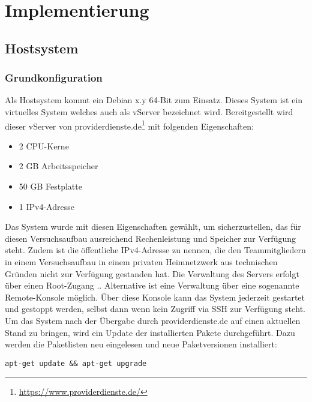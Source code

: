 \chapter{Implementierung}
\label{ch:Implementierung}

\section{Hostsystem}
\label{sec:Hostsystem}

\subsection{Grundkonfiguration}
\label{subsec:Grundkonfiguration}

Als Hostsystem kommt ein Debian x.y 64-Bit zum Einsatz. Dieses System ist ein virtuelles System welches auch als vServer bezeichnet wird. Bereitgestellt wird dieser vServer von providerdienste.de\footnote{\url{https://www.providerdienste.de/}} mit folgenden Eigenschaften:

\begin{itemize}
\item 2 CPU-Kerne %
\item 2 GB Arbeitsspeicher
\item 50 GB Festplatte
\item 1 IPv4-Adresse
\end{itemize}

Das System wurde mit diesen Eigenschaften gewählt, um sicherzustellen, das für diesen Versuchsaufbau ausreichend Rechenleistung und Speicher zur Verfügung steht. Zudem ist die öffentliche IPv4-Adresse zu nennen, die den Teammitgliedern in einem Versuchsaufbau in einem privaten Heimnetzwerk aus technischen Gründen nicht zur Verfügung gestanden hat. Die Verwaltung des Servers erfolgt über einen Root-Zugang .. %
Alternative ist eine Verwaltung über eine sogenannte Remote-Konsole möglich. Über diese Konsole  kann das System jederzeit gestartet und gestoppt werden, selbst dann wenn kein Zugriff via SSH zur Verfügung steht.\\

Um das System nach der Übergabe durch providerdienste.de auf einen aktuellen Stand zu bringen, wird ein Update der installierten Pakete durchgeführt. Dazu werden die Paketlisten neu eingelesen und neue Paketversionen installiert:

\begin{lstlisting}[style=customc]
apt-get update && apt-get upgrade
\end{lstlisting}

